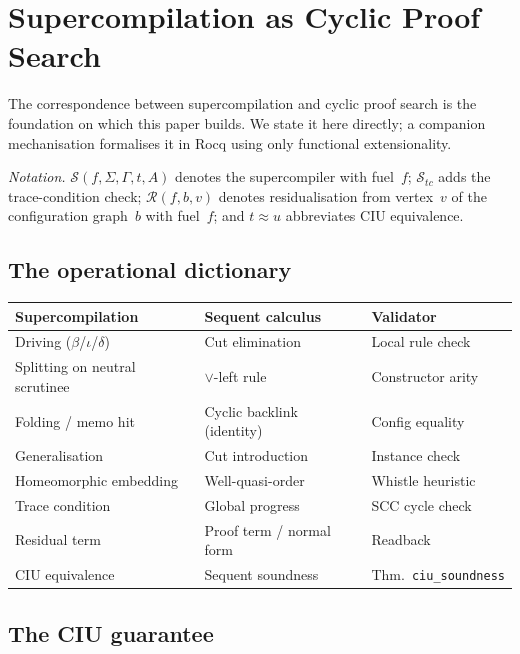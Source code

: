 \section{Supercompilation as Cyclic Proof Search}
\label{sec:background}

The correspondence between supercompilation and cyclic proof search is the
foundation on which this paper builds.  We state it here directly; a
companion mechanisation formalises it in Rocq using only functional extensionality.

\emph{Notation.}  $\mathcal{S}(f,\Sigma,\Gamma,t,A)$ denotes the supercompiler
with fuel~$f$; $\mathcal{S}_{\!\mathit{tc}}$ adds the trace-condition check;
$\mathcal{R}(f,b,v)$ denotes residualisation from vertex~$v$ of the
configuration graph~$b$ with fuel~$f$; and $t\approx u$ abbreviates CIU
equivalence.\smallskip

\subsection{The operational dictionary}

\begin{center}
\small
\begin{tabular}{lll}
\toprule
\textbf{Supercompilation} & \textbf{Sequent calculus} & \textbf{Validator} \\
\midrule
Driving ($\beta$/$\iota$/$\delta$) & Cut elimination & Local rule check \\
Splitting on neutral scrutinee & $\vee$-left rule & Constructor arity \\
Folding / memo hit & Cyclic backlink (identity) & Config equality \\
Generalisation & Cut introduction & Instance check \\
Homeomorphic embedding & Well-quasi-order & Whistle heuristic \\
Trace condition & Global progress & SCC cycle check \\
Residual term & Proof term / normal form & Readback \\
CIU equivalence & Sequent soundness & Thm.\ \texttt{ciu\_soundness} \\
\bottomrule
\end{tabular}
\end{center}

\subsection{The CIU guarantee}

